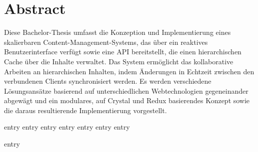 \frontmatter
\maketitle

\chapter{Abstract}
\label{abstract}

Diese Bachelor-Thesis umfasst die Konzeption und Implementierung eines
skalierbaren Content-Management-Systems, das über ein reaktives
Benutzerinterface verfügt sowie eine API bereitstellt, die einen hierarchischen
Cache über die Inhalte verwaltet.  Das System ermöglicht das kollaborative
Arbeiten an hierarchischen Inhalten, indem Änderungen in Echtzeit zwischen den
verbundenen Clients synchronisiert werden.  Es werden verschiedene
Lösungsansätze basierend auf unterschiedlichen Webtechnologien gegeneinander
abgewägt und ein modulares, auf Crystal und Redux basierendes Konzept
sowie die daraus resultierende Implementierung vorgestellt.

\tableofcontents

\mainmatter
{entry}
{entry}
{entry}
{entry}
{entry}
{entry}
{entry}

\backmatter
\printbibliography%
\printindex
{entry}
